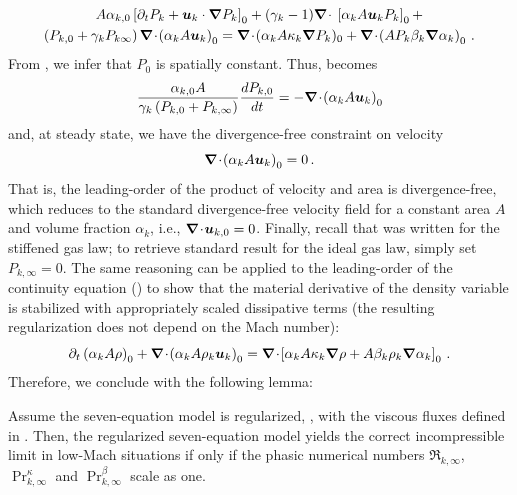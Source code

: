 %
\begin{multline}\label{eq:asympt_equ3_ener}
A \alpha_{k,0} \left[ \partial_t  P_k  + \mbold u_k \cdot \grad  P_k \right]_0 + 
(\gamma_k-1) \div \ \left[ \alpha_k A \mbold u_k P_k \right]_0 +\\ 
\left( P_{k,0} +  \gamma_k P_{k\infty} \right) \div  \left(\alpha_k A \mbold u_k \right )_0 = 
\div (\alpha_k A \kappa_k \grad P_k)_0 + \div \left( A P_k \beta_k \grad \alpha_k \right)_0 \,.
\end{multline}
%
From , we infer that $P_0$ is spatially constant. Thus,  becomes
%
\begin{equation}\label{eq:div_free_energy}
\frac{\alpha_{k,0}  A}{\gamma_k\left( P_{k,0} + P_{k,\infty} \right)} \frac{d P_{k,0}}{dt} = - \boldsymbol\nabla\! \cdot \! \left( \alpha_k A \boldsymbol u_k \right)_0 
\end{equation}
%
and, at steady state, we have the divergence-free constraint on velocity
%
\begin{equation}
\boldsymbol\nabla\! \cdot \! \left( \alpha_k A \boldsymbol u_k \right)_0  = 0 \, .
\end{equation}
%
That is, the leading-order of the product of velocity and area is divergence-free, which reduces to the standard divergence-free 
velocity field for a constant area $A$ and volume fraction $\alpha_k$, i.e., $\boldsymbol\nabla\! \cdot \! \boldsymbol u_{k,0}=0$. Finally, recall that 
 was written for the stiffened gas law; to retrieve standard result for the ideal gas law, simply set $P_{k,\infty}=0$. 
%
The same reasoning can be applied to the leading-order 
of the continuity equation () to show that the material derivative of the density variable is stabilized with 
appropriately scaled dissipative terms (the resulting regularization does not depend on the Mach number):
\begin{equation}
\partial_t \left( \alpha_k A \rho\right)_0 + \boldsymbol\nabla\! \cdot \! \left( \alpha_k A \rho_k \boldsymbol u_k \right)_0 =
\boldsymbol\nabla\! \cdot \! \left[ \alpha_k A \kappa_k \boldsymbol\nabla \rho + A \beta_k \rho_k \boldsymbol\nabla \alpha_k \right]_0 \, .
\end{equation}
%
Therefore, we conclude with the following lemma:
%
\begin{lemma}
Assume the seven-equation model is regularized, , with the viscous fluxes defined in . 
Then, the regularized seven-equation model yields the correct incompressible limit in low-Mach situations if only if the phasic numerical numbers $\Re_{k,\infty}$, $\Pr^\kappa_{k,\infty}$
and $\Pr^\beta_{k,\infty}$ scale as one.
\end{lemma}
%
